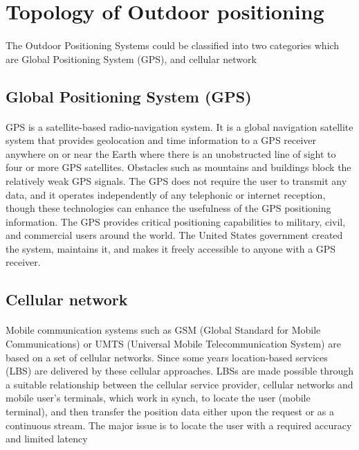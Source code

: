 \newpage
\section{Topology of Outdoor positioning}
\paragraph{}
The Outdoor Positioning Systems could be classified into two categories which
are Global Positioning System (GPS), and cellular network
\subsection{Global Positioning System (GPS)}
\paragraph{}
 GPS is a satellite-based radio-navigation system. It is a global navigation satellite system that provides geolocation and time information to a GPS receiver anywhere on or near the Earth where there is an unobstructed line of sight to four or more GPS satellites. Obstacles such as mountains and buildings block the relatively weak GPS signals. The GPS does not require the user to transmit any data, and it operates independently of any telephonic or internet reception, though these technologies can enhance the usefulness of the GPS positioning information. The GPS provides critical positioning capabilities to military, civil, and commercial users around the world. The United States government created the system, maintains it, and makes it freely accessible to anyone with a GPS receiver.

\subsection{Cellular network}
\paragraph{}
Mobile communication systems such as GSM (Global Standard for Mobile Communications) or UMTS (Universal
Mobile Telecommunication System) are based on a set of cellular networks. Since some years location-based services
(LBS) are delivered by these cellular approaches. LBSs are made possible through a suitable relationship between the
cellular service provider, cellular networks and mobile user’s terminals, which work in synch, to locate the user (mobile
terminal), and then transfer the position data either upon the request or as a continuous stream. The major issue is to
locate the user with a required accuracy and limited latency


